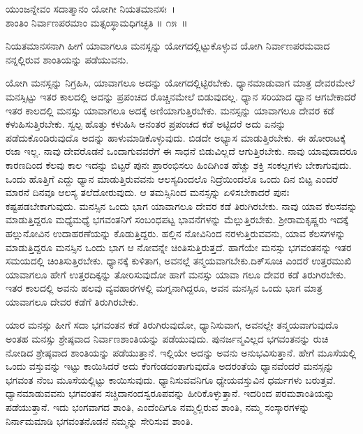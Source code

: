 \begin{shloka}
ಯುಂಜನ್ನೇವಂ ಸದಾತ್ಮಾನಂ ಯೋಗೀ ನಿಯತಮಾನಸಃ~।\\ಶಾಂತಿಂ ನಿರ್ವಾಣಪರಮಾಂ ಮತ್ಸಂಸ್ಥಾಮಧಿಗಚ್ಛತಿ \hfill॥ ೧೫~॥
\end{shloka}

\begin{artha}
ನಿಯತಮಾನಸನಾಗಿ ಹೀಗೆ ಯಾವಾಗಲೂ ಮನಸ್ಸನ್ನು ಯೋಗದಲ್ಲಿಟ್ಟುಕೊಳ್ಳುವ ಯೋಗಿ ನಿರ್ವಾಣ\-ಪರಮವಾದ ನನ್ನಲ್ಲಿರುವ ಶಾಂತಿಯನ್ನು ಪಡೆಯುವನು.
\end{artha}

\newpage

ಯೋಗಿ ಮನಸ್ಸನ್ನು ನಿಗ್ರಹಿಸಿ, ಯಾವಾಗಲೂ ಅದನ್ನು ಯೋಗದಲ್ಲಿಟ್ಟಿರಬೇಕು. ಧ್ಯಾನ\-ಮಾಡುವಾಗ ಮಾತ್ರ ದೇವರಮೇಲೆ ಮನಸ್ಸಿಟ್ಟು ಇತರ ಕಾಲದಲ್ಲಿ ಅದನ್ನು ಪ್ರಪಂಚದ ರೊಚ್ಚಿನ\-ಮೇಲೆ ಬಿಡುವುದಲ್ಲ. ಧ್ಯಾನ ಸರಿಯಾದ ಧ್ಯಾನ ಆಗಬೇಕಾದರೆ ಇತರ ಕಾಲದಲ್ಲಿ ಮನಸ್ಸು ಯಾವಾಗಲೂ ಅದಕ್ಕೆ ಅಣಿಯಾಗುತ್ತಿರಬೇಕು. ಮನಸ್ಸನ್ನು ಯಾವಾಗಲೂ ದೇವರ ಕಡೆ ಕಳುಹಿ\-ಸುತ್ತಿರಬೇಕು. ಸ್ವಲ್ಪ ಹೊತ್ತು ಕಳುಹಿಸಿ ಅನಂತರ ಪ್ರಪಂಚದ ಕಡೆ ಅಟ್ಟಿದರೆ ಅದು ಏನನ್ನು ಪಡೆದುಕೊಂಡಿರುವುದೊ ಅದನ್ನು ಹಾಳುಮಾಡಿಕೊಳ್ಳುವುದು. ಬಿಡದೇ ಅಭ್ಯಾಸ ಮಾಡುತ್ತಿರಬೇಕು. ಈ ಹೋರಾಟಕ್ಕೆ ರಜಾ ಇಲ್ಲ. ನಾವು ದೇವರೊಡನೆ ಒಂದಾಗುವವರೆಗೆ ಈ ಸಾಧನೆ ಬಿಡುವಿಲ್ಲದೆ ಆಗುತ್ತಿರಬೇಕು. ನಾವು ಯಾವುದಾದರೂ ಕಾರಣದಿಂದ ಕೆಲವು ಕಾಲ ಇದನ್ನು ಬಿಟ್ಟರೆ ಪುನಃ ಪ್ರಾರಂಭಿಸಲು ಹಿಂದಿಗಿಂತ ಹೆಚ್ಚು ಶಕ್ತಿ ಸಂಕಲ್ಪಗಳು ಬೇಕಾಗುವುದು. ಒಂದು ಹೊತ್ತಿಗೆ ಎದ್ದು ಧ್ಯಾನ ಮಾಡುತ್ತಿರುವವನು ಆಲಸ್ಯದಿಂದಲೊ ನಿದ್ರೆಯಿಂದಲೊ ಒಂದು ದಿನ ಬಿಟ್ಟ ಎಂದರೆ ಮಾರನೆ ದಿನವೂ ಆಲಸ್ಯ ತಲೆದೋರುವುದು. ಆ ತಮಸ್ಸಿನಿಂದ ಮನಸ್ಸನ್ನು ಏಳಿಸಬೇಕಾದರೆ ಪುನಃ ಕಷ್ಟಪಡಬೇಕಾಗುವುದು. ಮನಸ್ಸಿನ ಒಂದು ಭಾಗ ಯಾವಾಗಲೂ ದೇವರ ಕಡೆ ತಿರುಗಿರಬೇಕು. ನಾವು ಯಾವ ಕೆಲಸವನ್ನು ಮಾಡುತ್ತಿದ್ದರೂ ಮಧ್ಯೆಮಧ್ಯೆ ಭಗವಂತನಿಗೆ ಸಂಬಂಧಪಟ್ಟ ಭಾವನೆಗಳನ್ನು ಮೆಲ್ಲುತ್ತಿರಬೇಕು. ಶ‍್ರೀರಾಮಕೃಷ್ಣರು ಇದಕ್ಕೆ ಹಲ್ಲುನೋವಿನ ಉದಾಹರಣೆಯನ್ನು ಕೊಡುತ್ತಿದ್ದರು. ಹಲ್ಲಿನ ನೋವಿನಿಂದ ನರಳುತ್ತಿರುವವನು, ಯಾವ ಕೆಲಸಗಳನ್ನು ಮಾಡುತ್ತಿದ್ದರೂ ಮನಸ್ಸಿನ ಒಂದು ಭಾಗ ಆ ನೋವನ್ನೇ ಚಿಂತಿಸುತ್ತಿರುತ್ತದೆ. ಹಾಗೆಯೇ ಮನಸ್ಸು ಭಗವಂತನನ್ನು ಇತರ ಸಮಯದಲ್ಲಿ ಚಿಂತಿಸುತ್ತಿರಬೇಕು. ಧ್ಯಾನಕ್ಕೆ ಕುಳಿತಾಗ, ಅವನಲ್ಲೆ ತನ್ಮಯವಾಗಬೇಕು.\break ದಿಕ್​ಸೂಚಿ ಎಂದರೆ ಉತ್ತರಮುಖಿ ಯಾವಾಗಲೂ ಹೇಗೆ ಉತ್ತರದಿಕ್ಕನ್ನು ತೋರಿಸುವುದೋ ಹಾಗೆ ಮನಸ್ಸು ಯಾವಾ ಗಲೂ ದೇವರ ಕಡೆ ತಿರುಗಿರಬೇಕು. ಇತರ ಕಾಲದಲ್ಲಿ ಅವನು ಹಲವು ವ್ಯವಹಾರಗಳಲ್ಲಿ ಮಗ್ನನಾಗಿದ್ದರೂ, ಅವನ ಮನಸ್ಸಿನ ಒಂದು ಭಾಗ ಮಾತ್ರ ಯಾವಾಗಲೂ ದೇವರ ಕಡೆಗೆ ತಿರುಗಿರಬೇಕು.

ಯಾರ ಮನಸ್ಸು ಹೀಗೆ ಸದಾ ಭಗವಂತನ ಕಡೆ ತಿರುಗಿರುವುದೋ, ಧ್ಯಾನಿಸುವಾಗ, ಅವನಲ್ಲೇ ತನ್ಮಯವಾಗುವುದೊ ಅಂತಹ ಮನಸ್ಸು ಶ್ರೇಷ್ಠವಾದ ನಿರ್ವಾಣಶಾಂತಿಯನ್ನು ಪಡೆಯುವುದು. ಪುನರ್ಜನ್ಮವಿಲ್ಲದ ಭಗವಂತನನ್ನು ರುಚಿ ನೋಡಿದ ಶ್ರೇಷ್ಠವಾದ ಶಾಂತಿಯನ್ನು ಪಡೆಯುತ್ತಾನೆ. ಇಲ್ಲಿಯೇ ಅದನ್ನು ಅವನು ಅನುಭವಿಸುತ್ತಾನೆ. ಹೇಗೆ ಮೂಸೆಯಲ್ಲಿ ಒಂದು ವಸ್ತುವನ್ನು ಇಟ್ಟು ಕಾಯಿಸಿದರೆ ಅದು ಕೆಂಗೆಂಡದಂತಾಗುವುದೊ ಅದರಂತೆಯೆ ಧ್ಯಾನವೆಂದರೆ ಮನಸ್ಸನ್ನು ಭಗವಂತ ನೆಂಬ ಮೂಸೆಯಲ್ಲಿಟ್ಟು ಕಾಯಿಸುವುದು. ಧ್ಯಾನಿಸುವವನಿಗೂ ಧ್ಯೇಯವಸ್ತುವಿನ ಧರ್ಮಗಳು ಬರುತ್ತವೆ. ಧ್ಯಾನಮಾಡುವವನು ಭಗವಂತನ ಸಚ್ಚಿದಾನಂದಸ್ವರೂಪವನ್ನು ಹೀರಿಕೊಳ್ಳುತ್ತಾನೆ. ಇದರಿಂದ ಪರಮಶಾಂತಿಯನ್ನು ಪಡೆಯುತ್ತಾನೆ. ಇದು ಭಂಗವಾಗದ ಶಾಂತಿ, ಎಂದೆಂದಿಗೂ ನಮ್ಮಲ್ಲಿರುವ ಶಾಂತಿ, ನಮ್ಮ ಸಂಸ್ಕಾರಗಳನ್ನು ನಿರ್ನಾಮಮಾಡಿ ಭಗವಂತನೊಡನೆ ನಮ್ಮನ್ನು ಸೇರಿಸುವ ಶಾಂತಿ.

